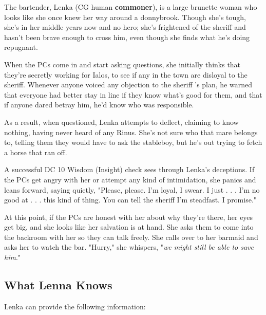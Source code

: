 \documentclass[10pt,a4paper,twoside,bg=print,twocolumn,openany,nodeprecatedcode]{dndbook}
\begin{document}
The bartender, Lenka (CG human \textbf{commoner}), is a large brunette woman who looks like she once knew her way around a donnybrook. Though she's tough, she's in her middle years now and no hero; she's frightened of the sheriff and hasn't been brave enough to cross him, even though she finds what he's doing repugnant.

When the PCs come in and start asking questions, she initially thinks that they're secretly working for Ialos, to see if any in the town are disloyal to the sheriff. Whenever anyone voiced any objection to the sheriff 's plan, he warned that everyone had better stay in line if they know what's good for them, and that if anyone dared betray him, he'd know who was responsible.

As a result, when questioned, Lenka attempts to deflect, claiming to know nothing, having never heard of any Rinus. She's not sure who that mare belongs to, telling them they would have to ask the stableboy, but he's out trying to fetch a horse that ran off.

A successful DC 10 Wisdom (Insight) check sees through Lenka's deceptions. If the PCs get angry with her or attempt any kind of intimidation, she panics and leans forward, saying quietly, "Please, please. I'm loyal, I swear. I just . . . I'm no good at . . . this kind of thing. You can tell the sheriff I'm steadfast. I promise."

At this point, if the PCs are honest with her about why they're there, her eyes get big, and she looks like her salvation is at hand. She asks them to come into the backroom with her so they can talk freely. She calls over to her barmaid and asks her to watch the bar. "Hurry," she whispers, "\textit{we might still be able to save him}."

\subsection{What Lenna Knows}
Lenka can provide the following information:
\end{document}
